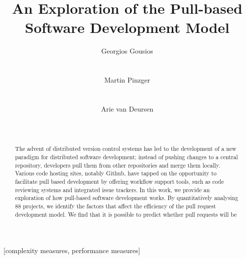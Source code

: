 \documentclass{acm_proc_article-sp}
\begin{document}
\newcommand{\todo}[1]{\textbf{TODO}\footnote{\textbf{TODO:} #1}}

\title{An Exploration of the Pull-based Software Development Model}

\author{
\alignauthor
Georgios Gousios\\
       \\
       \\
\alignauthor
Martin Pinzger\\
       \\
       \\
\alignauthor
Arie van Deursen\\
       \\
       \\       
}

\maketitle

\begin{abstract}

  The advent of distributed version control systems has led to the development
  of a new paradigm for distributed software development; instead of pushing
  changes to a central repository, developers pull them from other repositories
  and merge them locally. Various code hosting sites, notably Github, have
  tapped on the opportunity to facilitate pull based development by offering
  workflow support tools, such as code reviewing systems and integrated issue
  trackers. In this work, we provide an exploration of how pull-based software
  development works. By quantitatively analysing 88 projects, we
  identify the factors that affect the efficiency of the pull request
  development model. We find that it is possible to predict whether 
  pull requests will be 

\end{abstract}

[complexity measures, performance measures]
\end{document}
